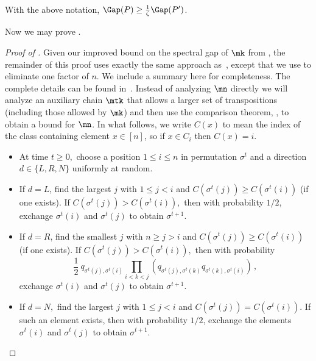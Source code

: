 \begin{theorem}\label{thm_comp}
With the above notation, $\Gap(P)\geq \frac{1}{\zeta} \Gap(P')$.
\end{theorem}

Now we may prove .\\

%
\begin{proof}[Proof of ]
Given our improved bound on the spectral gap of $\mk$ from
, the remainder of this proof uses exactly the
same approach as~\cite{MS}, except that we use 
to eliminate one factor of $n$.  We include a summary here for
completeness.  The complete details can be found in~\cite{MS}.
Instead of analyzing $\mn$ directly we will analyze an auxiliary chain
$\mtk$ that allows a larger set of transpositions (including those
allowed by $\mk$) and then use the comparison theorem, ,
to obtain a bound for $\mn$.   
In what follows, we write $C(x)$ to mean the index of the class containing element $x\in [n]$, so if $x\in C_i$ then $C(x)=i$.

\vspace{.1in}

\vspace{.05in}
\begin{itemize}
\item At time $t\geq0,$ choose a position $1\leq i \leq n$ in permutation $\sigma^t$ and a direction $d \in \{L, R,N\}$ uniformly at random.  
\item If $d = L$, find the largest $j$ with $1 \leq j<i$ and $C(\sigma^t(j)) \geq C(\sigma^t(i))$ (if one exists).  If $C(\sigma^t(j)) > C(\sigma^t(i)),$ then 
with probability $1/2$,
exchange $\sigma^t(i)$ and $\sigma^t(j)$ to obtain $\sigma^{t+1}.$  
\item If $d = R$, find the smallest $j$ with $n\geq j>i$ and $C(\sigma^t(j)) \geq C(\sigma^t(i))$ (if one exists).  If $C(\sigma^t(j)) > C(\sigma^t(i)),$ then with probability 
$$\frac{1}{2}~ q_{\sigma^t(j),\sigma^t(i)}  \prod_{i<k<j}\left(q_{\sigma^t(j),\sigma^t(k)}q_{\sigma^t(k),\sigma^t(i)}\right)\,,$$
exchange $\sigma^t(i)$ and $\sigma^t(j)$ to obtain $\sigma^{t+1}.$  
\item If $d = N,$  find the largest $j$ with $1\leq j<i$ and $C(\sigma^t(j)) = C(\sigma^t(i)).$  If such an element exists, then with probability $1/2$, exchange the elements $\sigma^t(i)$ and $\sigma^t(j)$ to obtain $\sigma^{t+1}.$ 


\end{itemize}
\end{proof}
